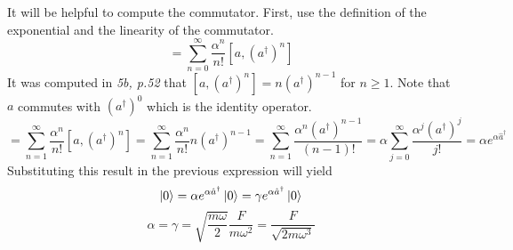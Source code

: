 \begin{sol}
\begin{enumerate}[label=\textbf{(\alph*)}]
It will be helpful to compute the commutator. First, use the definition of the exponential and the linearity of the commutator.
\begin{equation}
	[\hat a,e^{\alpha\hat a^\dagger}]=\sum_{n=0}^\infty\frac{\alpha^n}{n!}[a,(a^\dagger)^n]
\end{equation}
It was computed in \textit{5b, p.52} that $[a,(a^\dagger)^n]=n(a^\dagger)^{n-1}$ for $n\geq 1$. Note that $a$ commutes with $(a^\dagger)^0$ which is the identity operator.
\begin{equation}
	[\hat a,e^{\alpha\hat a^\dagger}]=\sum_{n=1}^\infty\frac{\alpha^n}{n!}[a,(a^\dagger)^n]=\sum_{n=1}^\infty\frac{\alpha^n}{n!}n(a^\dagger)^{n-1}=\sum_{n=1}^\infty\frac{\alpha^n(a^\dagger)^{n-1}}{(n-1)!}=\alpha\sum_{j=0}^\infty\frac{\alpha^j(a^\dagger)^{j}}{j!}=\alpha e^{\alpha \hat a^\dagger}
\end{equation} 
Substituting this result in the previous expression will yield
\begin{equation}
	[\hat a,e^{\alpha\hat a^\dagger}]\ket 0=\alpha e^{\alpha\hat a^\dagger}\ket 0=\gamma e^{\alpha\hat a^\dagger}\ket 0
\end{equation}
\begin{equation}
	\alpha=\gamma=\sqrt{\frac{m\omega}{2}}\frac{F}{m\omega^2}=\frac{F}{\sqrt{2m\omega^3}}
\end{equation} 

\end{enumerate}
\end{sol}